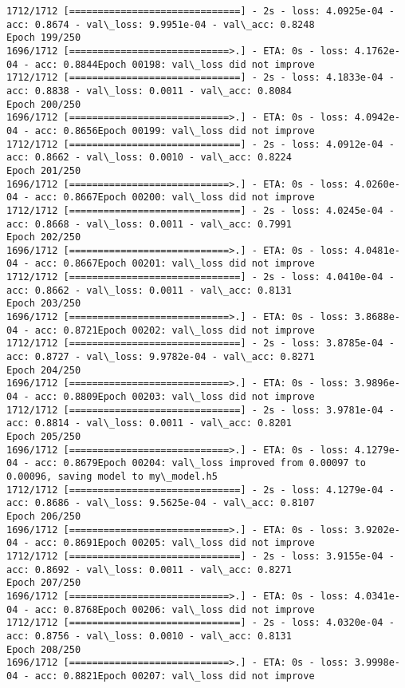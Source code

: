 \documentclass[11pt]{article}
\begin{document}
\begin{Verbatim}[commandchars=\\\{\}]
1712/1712 [==============================] - 2s - loss: 4.0925e-04 - acc: 0.8674 - val\_loss: 9.9951e-04 - val\_acc: 0.8248
Epoch 199/250
1696/1712 [============================>.] - ETA: 0s - loss: 4.1762e-04 - acc: 0.8844Epoch 00198: val\_loss did not improve
1712/1712 [==============================] - 2s - loss: 4.1833e-04 - acc: 0.8838 - val\_loss: 0.0011 - val\_acc: 0.8084
Epoch 200/250
1696/1712 [============================>.] - ETA: 0s - loss: 4.0942e-04 - acc: 0.8656Epoch 00199: val\_loss did not improve
1712/1712 [==============================] - 2s - loss: 4.0912e-04 - acc: 0.8662 - val\_loss: 0.0010 - val\_acc: 0.8224
Epoch 201/250
1696/1712 [============================>.] - ETA: 0s - loss: 4.0260e-04 - acc: 0.8667Epoch 00200: val\_loss did not improve
1712/1712 [==============================] - 2s - loss: 4.0245e-04 - acc: 0.8668 - val\_loss: 0.0011 - val\_acc: 0.7991
Epoch 202/250
1696/1712 [============================>.] - ETA: 0s - loss: 4.0481e-04 - acc: 0.8667Epoch 00201: val\_loss did not improve
1712/1712 [==============================] - 2s - loss: 4.0410e-04 - acc: 0.8662 - val\_loss: 0.0011 - val\_acc: 0.8131
Epoch 203/250
1696/1712 [============================>.] - ETA: 0s - loss: 3.8688e-04 - acc: 0.8721Epoch 00202: val\_loss did not improve
1712/1712 [==============================] - 2s - loss: 3.8785e-04 - acc: 0.8727 - val\_loss: 9.9782e-04 - val\_acc: 0.8271
Epoch 204/250
1696/1712 [============================>.] - ETA: 0s - loss: 3.9896e-04 - acc: 0.8809Epoch 00203: val\_loss did not improve
1712/1712 [==============================] - 2s - loss: 3.9781e-04 - acc: 0.8814 - val\_loss: 0.0011 - val\_acc: 0.8201
Epoch 205/250
1696/1712 [============================>.] - ETA: 0s - loss: 4.1279e-04 - acc: 0.8679Epoch 00204: val\_loss improved from 0.00097 to 0.00096, saving model to my\_model.h5
1712/1712 [==============================] - 2s - loss: 4.1279e-04 - acc: 0.8686 - val\_loss: 9.5625e-04 - val\_acc: 0.8107
Epoch 206/250
1696/1712 [============================>.] - ETA: 0s - loss: 3.9202e-04 - acc: 0.8691Epoch 00205: val\_loss did not improve
1712/1712 [==============================] - 2s - loss: 3.9155e-04 - acc: 0.8692 - val\_loss: 0.0011 - val\_acc: 0.8271
Epoch 207/250
1696/1712 [============================>.] - ETA: 0s - loss: 4.0341e-04 - acc: 0.8768Epoch 00206: val\_loss did not improve
1712/1712 [==============================] - 2s - loss: 4.0320e-04 - acc: 0.8756 - val\_loss: 0.0010 - val\_acc: 0.8131
Epoch 208/250
1696/1712 [============================>.] - ETA: 0s - loss: 3.9998e-04 - acc: 0.8821Epoch 00207: val\_loss did not improve

\end{Verbatim}
\end{document}

